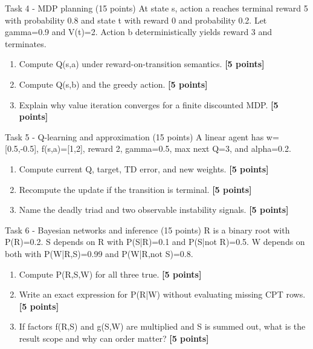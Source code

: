 \documentclass[aspectratio=169,11pt]{beamer}
\begin{document}
\begin{frame}{Task 4 - MDP planning (15 points)}
\small
At state s, action a reaches terminal reward 5 with probability 0.8 and state t with reward 0 and probability 0.2. Let gamma=0.9 and V(t)=2. Action b deterministically yields reward 3 and terminates.

\vspace{0.2cm}
\begin{enumerate}
\item[\textbf{a.}] Compute Q(s,a) under reward-on-transition semantics. \hfill{\color{courseblue}\textbf{[5 points]}}
\item[\textbf{b.}] Compute Q(s,b) and the greedy action. \hfill{\color{courseblue}\textbf{[5 points]}}
\item[\textbf{c.}] Explain why value iteration converges for a finite discounted MDP. \hfill{\color{courseblue}\textbf{[5 points]}}
\end{enumerate}
\end{frame}

\begin{frame}{Task 5 - Q-learning and approximation (15 points)}
\small
A linear agent has w=[0.5,-0.5], f(s,a)=[1,2], reward 2, gamma=0.5, max next Q=3, and alpha=0.2.

\vspace{0.2cm}
\begin{enumerate}
\item[\textbf{a.}] Compute current Q, target, TD error, and new weights. \hfill{\color{courseblue}\textbf{[5 points]}}
\item[\textbf{b.}] Recompute the update if the transition is terminal. \hfill{\color{courseblue}\textbf{[5 points]}}
\item[\textbf{c.}] Name the deadly triad and two observable instability signals. \hfill{\color{courseblue}\textbf{[5 points]}}
\end{enumerate}
\end{frame}

\begin{frame}{Task 6 - Bayesian networks and inference (15 points)}
\small
R is a binary root with P(R)=0.2. S depends on R with P(S|R)=0.1 and P(S|not R)=0.5. W depends on both with P(W|R,S)=0.99 and P(W|R,not S)=0.8.

\vspace{0.2cm}
\begin{enumerate}
\item[\textbf{a.}] Compute P(R,S,W) for all three true. \hfill{\color{courseblue}\textbf{[5 points]}}
\item[\textbf{b.}] Write an exact expression for P(R|W) without evaluating missing CPT rows. \hfill{\color{courseblue}\textbf{[5 points]}}
\item[\textbf{c.}] If factors f(R,S) and g(S,W) are multiplied and S is summed out, what is the result scope and why can order matter? \hfill{\color{courseblue}\textbf{[5 points]}}
\end{enumerate}
\end{frame}
\end{document}
